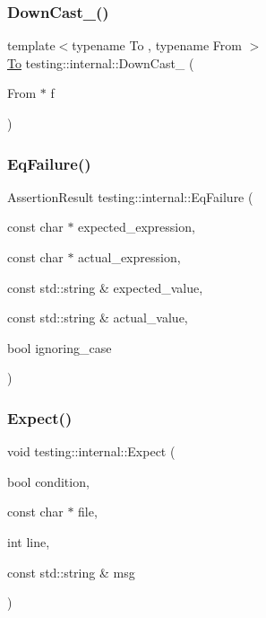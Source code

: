 \subsubsection{\texorpdfstring{DownCast\_()}{DownCast\_()}}
{\footnotesize\ttfamily template$<$typename To , typename From $>$ \\
\mbox{\hyperlink{classtesting_1_1internal_1_1_to}{To}} testing\+::internal\+::\+Down\+Cast\+\_\+ (\begin{DoxyParamCaption}\item[{From $\ast$}]{f }\end{DoxyParamCaption})\hspace{0.3cm}{\ttfamily [inline]}}

\mbox{\label{namespacetesting_1_1internal_a08725846ff184d3e79bcf5be4df19157}} 
\subsubsection{\texorpdfstring{EqFailure()}{EqFailure()}}
{\footnotesize\ttfamily Assertion\+Result testing\+::internal\+::\+Eq\+Failure (\begin{DoxyParamCaption}\item[{const char $\ast$}]{expected\+\_\+expression,  }\item[{const char $\ast$}]{actual\+\_\+expression,  }\item[{const std\+::string \&}]{expected\+\_\+value,  }\item[{const std\+::string \&}]{actual\+\_\+value,  }\item[{bool}]{ignoring\+\_\+case }\end{DoxyParamCaption})}

\mbox{\label{namespacetesting_1_1internal_ad93379317e10862a77b9fb90aa96e083}} 
\subsubsection{\texorpdfstring{Expect()}{Expect()}\hspace{0.1cm}{\footnotesize\ttfamily [1/2]}}
{\footnotesize\ttfamily void testing\+::internal\+::\+Expect (\begin{DoxyParamCaption}\item[{bool}]{condition,  }\item[{const char $\ast$}]{file,  }\item[{int}]{line,  }\item[{const std\+::string \&}]{msg }\end{DoxyParamCaption})\hspace{0.3cm}{\ttfamily [inline]}}

